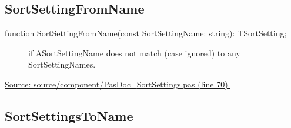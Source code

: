 \documentclass{report}
\newif\ifpdf
\begin{document}
\subsection*{SortSettingFromName}
\fi
\label{PasDoc_SortSettings-SortSettingFromName}
\begin{list}{}{
\setlength{\itemindent}{0cm}
\setlength{\listparindent}{0cm}
\setlength{\leftmargin}{\evensidemargin}
\addtolength{\leftmargin}{\tmplength}
\settowidth{\labelsep}{X}
\addtolength{\leftmargin}{\labelsep}
\setlength{\labelwidth}{\tmplength}
}
\item[\textbf{Declaration}\hfill]
\ifpdf
\begin{flushleft}
\fi
\begin{ttfamily}
function SortSettingFromName(const SortSettingName: string): TSortSetting;\end{ttfamily}

\ifpdf
\end{flushleft}
\fi

\par
\item[\textbf{Description}]
 \par
\item[\textbf{Exceptions}]
\begin{description}
\item[\begin{ttfamily}EInvalidSortSetting\end{ttfamily}(\ref{PasDoc_SortSettings.EInvalidSortSetting})] if ASortSettingName does not match (case ignored) to any SortSettingNames.
\end{description}
\par
\href{https://github.com/pasdoc/pasdoc/blob/master/source/component/PasDoc_SortSettings.pas#L70}{Source: source/component/PasDoc{\_}SortSettings.pas (line 70).}

\end{list}
\ifpdf
\subsection*{\large{\textbf{SortSettingsToName}}\normalsize\hspace{1ex}\hrulefill}
\else
\end{document}

